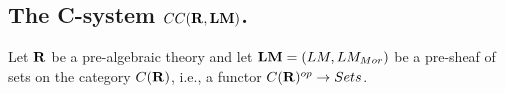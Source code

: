 \documentclass[11pt]{article}
\newcommand{\sr}{\rightarrow}
\newcommand{\rr}{{\bf R}}
\newcommand{\lm}{{\bf LM}}
\begin{document}
\subsection{The C-system $CC(\rr,\lm)$.}
%
Let $\rr$ be a pre-algebraic theory and let $\lm=(LM,LM_{Mor})$ be a pre-sheaf of sets on the category $C(\rr)$, i.e., a functor $C(\rr)^{op}\sr Sets$. 
\end{document}

